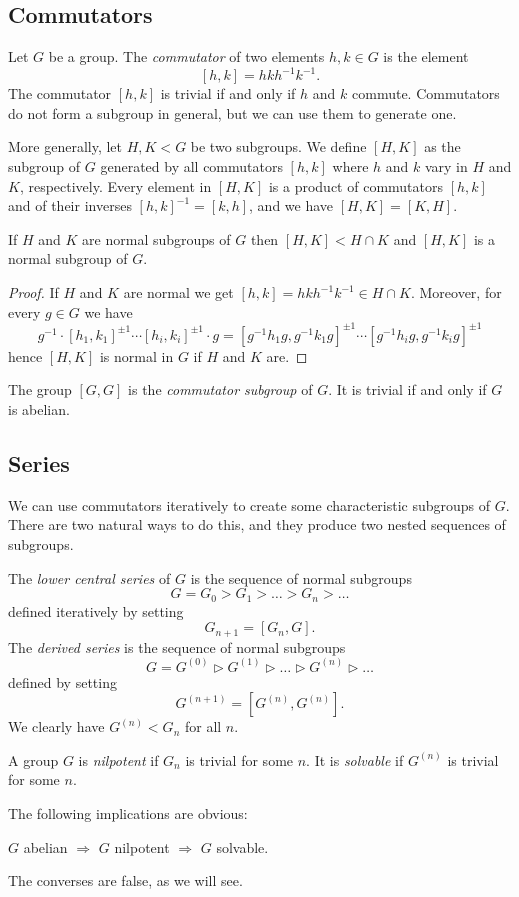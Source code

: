 \subsection{Commutators}
Let $G$ be a group. The \emph{commutator} of two elements $h,k \in G$ is the element 
$$[h,k] = hkh^{-1}k^{-1}.$$
The commutator $[h,k]$ is trivial if and only if $h$ and $k$ commute.
Commutators do not form a subgroup in general, but we can use them to generate one. 

More generally, let $H, K<G$ be two subgroups. We define $[H, K]$ as the subgroup of $G$ generated by all commutators $[h,k]$
where $h$ and $k$ vary in $H$ and $K$, respectively. Every element in $[H, K]$ is a product of commutators $[h,k]$ and of their inverses $[h,k]^{-1}=[k,h]$, and we have $[H, K] = [K, H]$.

\begin{prop} If $H$ and $K$ are normal subgroups of $G$ then $[H,K] < H\cap K$ and $[H,K]$ is a normal subgroup of $G$.
\end{prop}
\begin{proof}
If $H$ and $K$ are normal we get $[h,k] = hkh^{-1}k^{-1} \in H\cap K$. Moreover, for every $g\in G$ we have 
$$g^{-1}\cdot[h_1,k_1]^{\pm 1} \cdots [h_i, k_i]^{\pm 1} \cdot g = [g^{-1}h_1g,g^{-1}k_1g]^{\pm 1} \cdots
[g^{-1}h_ig, g^{-1}k_i g]^{\pm 1}$$
hence $[H,K]$ is normal in $G$ if $H$ and $K$ are.
\end{proof}

The group $[G,G]$ is the \emph{commutator subgroup} of $G$. It is trivial if and only if $G$ is abelian.

\subsection{Series}
We can use commutators iteratively to create some characteristic subgroups of $G$. There are two natural ways to do this, and they produce two nested sequences of subgroups.

The \emph{lower central series} of $G$ is the sequence of normal subgroups
$$ G = G_0 > G_1 > \ldots > G_n > \ldots $$
defined iteratively by setting
$$G_{n+1} = [G_n, G].$$ The \emph{derived series} is the sequence of normal subgroups
$$G = G^{(0)} \triangleright G^{(1)} \triangleright \ldots \triangleright G^{(n)} \triangleright \ldots $$
defined by setting
$$G^{(n+1)} = [G^{(n)}, G^{(n)}].$$
We clearly have $G^{(n)} < G_{n}$ for all $n$. 
 
\begin{defn} A group $G$ is \emph{nilpotent} if $G_n$ is trivial for some $n$. It is \emph{solvable} if $G^{(n)}$ is trivial for some $n$.
\end{defn}
The following implications are obvious:
\begin{center}
$G$ abelian $\Longrightarrow$ $G$ nilpotent $\Longrightarrow$ $G$ solvable.
\end{center}
The converses are false, as we will see.

